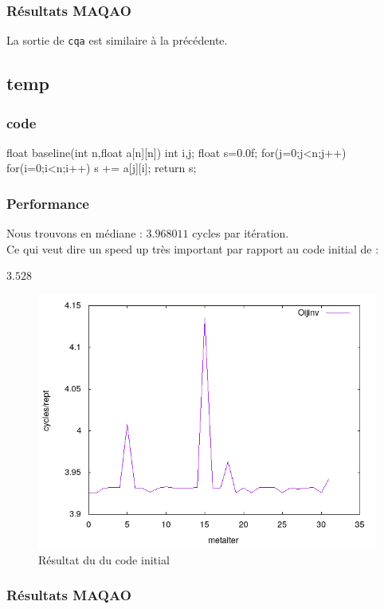\documentclass{report}
\begin{document}
  \subsubsection{Résultats MAQAO}
  La sortie de \texttt{cqa} est similaire à la précédente.










  \subsection{temp}
  \subsubsection{code}
  \begin{cc}
    float baseline(int n,float a[n][n])
    {
        int i,j;
        float s=0.0f;
        for(j=0;j<n;j++)
            for(i=0;i<n;i++)
                s += a[j][i];
        return s;
    }
  \end{cc}
  \subsubsection{Performance}
  Nous trouvons en médiane : $3.968011$ cycles par itération.\\
  Ce qui veut dire un speed up très important par rapport au code initial de :
  \begin{center}
      $3.528$
  \end{center}
  \begin{figure}[ht!]
    \centering
    \includegraphics[scale=0.45]{../metarep/Oijinv.png}
    \caption{Résultat du du code initial}
  \end{figure}
  \subsubsection{Résultats MAQAO}
  \begin{verbatim}
  \end{verbatim}

\end{document}
